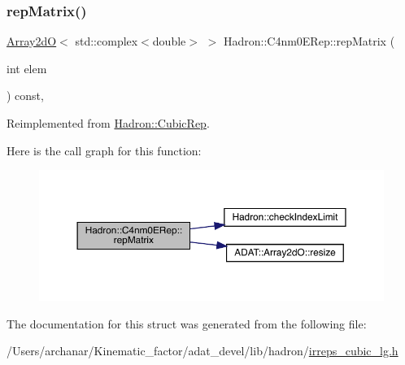 \subsubsection{\texorpdfstring{repMatrix()}{repMatrix()}\hspace{0.1cm}{\footnotesize\ttfamily [2/2]}}
{\footnotesize\ttfamily \mbox{\hyperlink{classADAT_1_1Array2dO}{Array2dO}}$<$ std\+::complex$<$double$>$ $>$ Hadron\+::\+C4nm0\+E\+Rep\+::rep\+Matrix (\begin{DoxyParamCaption}\item[{int}]{elem }\end{DoxyParamCaption}) const\hspace{0.3cm}{\ttfamily [inline]}, {\ttfamily [virtual]}}



Reimplemented from \mbox{\hyperlink{structHadron_1_1CubicRep_ac5d7e9e6f4ab1158b5fce3e4ad9e8005}{Hadron\+::\+Cubic\+Rep}}.

Here is the call graph for this function\+:
\nopagebreak
\begin{figure}[H]
\begin{center}
\leavevmode
\includegraphics[width=350pt]{d3/d8a/structHadron_1_1C4nm0ERep_aa9353c0f2a226224911c51db6f647ccf_cgraph}
\end{center}
\end{figure}


The documentation for this struct was generated from the following file\+:\begin{DoxyCompactItemize}
\item 
/\+Users/archanar/\+Kinematic\+\_\+factor/adat\+\_\+devel/lib/hadron/\mbox{\hyperlink{lib_2hadron_2irreps__cubic__lg_8h}{irreps\+\_\+cubic\+\_\+lg.\+h}}\end{DoxyCompactItemize}

